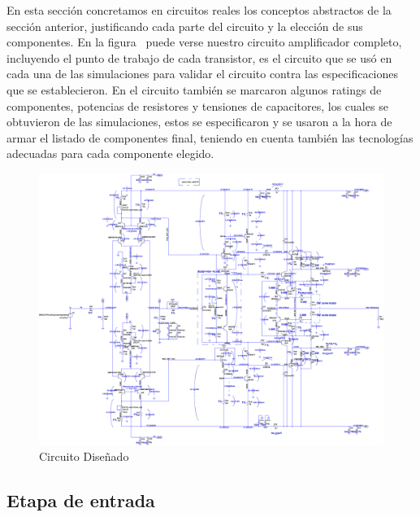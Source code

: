 En esta sección concretamos en circuitos reales los conceptos abstractos de la sección anterior, justificando cada parte del circuito y la elección de sus componentes.
En la figura~ puede verse nuestro circuito amplificador completo, incluyendo el punto de trabajo de cada transistor, es el circuito que se usó en cada una de las simulaciones para validar el circuito contra las especificaciones que se establecieron. En el circuito también se marcaron algunos ratings de componentes, potencias de resistores y tensiones de capacitores, los cuales se obtuvieron de las simulaciones, estos se especificaron y se usaron a la hora de armar el listado de componentes final, teniendo en cuenta también las tecnologías adecuadas para cada componente elegido.

\clearpage


\begin{figure}[H]
\centering
\includegraphics[width=0.9\paperwidth,angle=90,origin=c]{img/circuito.png}
\caption{Circuito Diseñado}
\label{fig:designed_circuit} 
\end{figure}

\clearpage


\subsection{Etapa de entrada}


